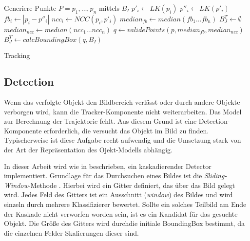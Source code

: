 	\begin{algorithm}[H]
	\vspace{0.2cm}
	Generiere Punkte $P = p_{1},\ldots,p_{n}$ mittels $B_{I}$\;
	 {
		$p'_{i} \leftarrow LK(p_{i})$\;
		$p''_{i} \leftarrow LK(p'_{i})$\;
		$fb_{i} \leftarrow |p_{i}-p''_{i}|$\;
		$ncc_{i} \leftarrow NCC(p_{i},p'_{i})$\;
	}
	$median_{fb}\leftarrow median(fb_{1}\ldots fb_{n})$\;
	 { 
		$B_{J}^T \leftarrow \emptyset$\;
	} {
		$median_{ncc} \leftarrow median(ncc_{1}\dots ncc_{n})$\;
		$q \leftarrow validePoints(p,median_{fb},median_{ncc})$\;
		$B_{J}^T \leftarrow calcBoundingBox(q,B_{I})$\;
	}
	\caption{Tracking}
	\label{alg:tracking}
	\vspace{0.2cm}
	\end{algorithm}

	\subsection{Detection}
	Wenn das verfolgte Objekt den Bildbereich verlässt oder durch andere Objekte verborgen wird, kann die Tracker-Komponente nicht weiterarbeiten. Das Model zur Berechnung der Trajektorie fehlt. Aus diesem Grund ist eine Detection-Komponente erforderlich, die versucht das Objekt im Bild zu finden. Typischerweise ist diese Aufgabe recht aufwendig und die Umsetzung stark von der Art der Repräsentation des Ojekt-Modells abhängig.

	In dieser Arbeit wird wie in \cite{TLD} beschrieben, ein kaskadierender Detector implementiert. Grundlage für das Durchsuchen eines Bildes ist die \textit{Sliding-Window}-Methode \cite{key-6}. Hierbei wird ein Gitter definiert, das über das Bild gelegt wird. Jedes Feld des Gitters ist ein Ausschnitt (\textit{window}) des Bildes und wird einzeln durch mehrere Klassifizierer bewertet. Sollte ein solches Teilbild am Ende der Kaskade nicht verworfen worden sein, ist es ein Kandidat für das gesuchte Objekt. Die Größe des Gitters wird durchdie initiale BoundingBox bestimmt, da die einzelnen Felder Skalierungen dieser sind. 

